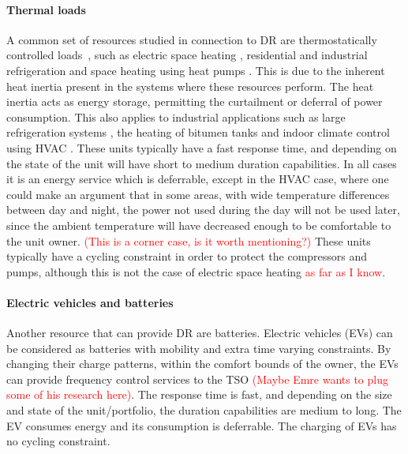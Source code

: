 \paragraph{Thermal loads}
A common set of resources studied in connection to DR are thermostatically controlled loads~\cite{Molina_Garcia_2011,Kara_2012}, such as electric space heating \cite{mathieu2012using,thavlov2014utilization}, residential and industrial refrigeration \cite{lakshmanan2014energy} and space heating using heat pumps \cite{halvgaard2012economic}. This is due to the inherent heat inertia present in the systems where these resources perform. The heat inertia acts as energy storage, permitting the curtailment or deferral of power consumption. This also applies to industrial applications such as large refrigeration systems \cite{rahnama2013integration}, the heating of bitumen tanks \cite{cheng2014availability} and indoor climate control using HVAC \cite{blum2013ancillary}. These units typically have a fast response time, and depending on the state of the unit will have short to medium duration capabilities. In all cases it is an energy service which is deferrable, except in the HVAC case, where one could make an argument that in some areas, with wide temperature differences between day and night, the power not used during the day will not be used later, since the ambient temperature will have decreased enough to be comfortable to the unit owner. \textcolor{red}{(This is a corner case, is it worth mentioning?)} These units typically have a cycling constraint in order to protect the compressors and pumps, although this is not the case of electric space heating \textcolor{red}{as far as I know}.

\paragraph{Electric vehicles and batteries}
Another resource that can provide DR are batteries. Electric vehicles (EVs) can be considered as batteries with mobility and extra time varying constraints. By changing their charge patterns, within the comfort bounds of the owner, the EVs can provide frequency control services to the TSO \cite{zarogiannis2014dynamic} \textcolor{red}{(Maybe Emre wants to plug some of his research here)}. The response time is fast, and depending on the size and state of the unit/portfolio, the duration capabilities are medium to long. The EV consumes energy and its consumption is deferrable. The charging of EVs has no cycling constraint.
